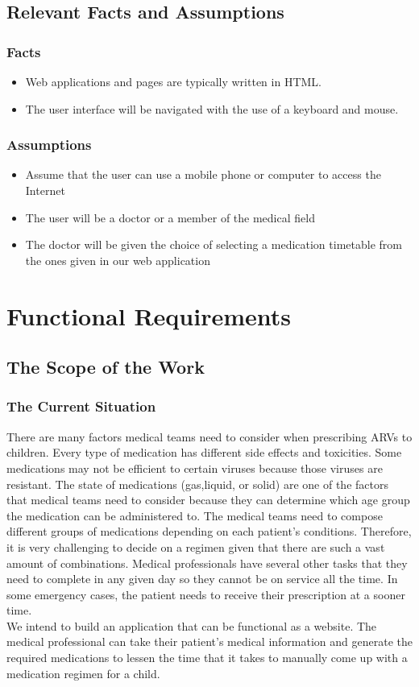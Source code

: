 \documentclass[12pt]{article}
\begin{document}
\subsection{Relevant Facts and Assumptions}
\subsubsection{Facts}
\begin{itemize}
\item Web applications and pages are typically written in HTML.
\item The user interface will be navigated with the use of a keyboard and mouse.
\end{itemize}
\subsubsection{Assumptions}
\begin{itemize}
\item Assume that the user can use a mobile phone or computer to access the Internet
\item The user will be a doctor or a member of the medical field
\item The doctor will be given the choice of selecting a medication timetable from the ones given in our web application
\end{itemize}

\section{Functional Requirements}
\setcounter{subsection}{6}
\subsection{The Scope of the Work}
\subsubsection{The Current Situation}
There are many factors medical teams need to consider when prescribing ARVs to children. Every type of medication has different side effects and toxicities. Some medications may not be efficient to certain viruses because those viruses are resistant. The state of medications (gas,liquid, or solid) are one of the factors that medical teams need to consider because they can determine which age group the medication can be administered to. The medical teams need to compose different groups of medications depending on each patient’s conditions. Therefore, it is very challenging to decide on a regimen given that there are such a vast amount of combinations. Medical professionals have several other tasks that they need to complete in any given day so they cannot be on service all the time. In some emergency cases, the patient needs to receive their prescription at a sooner time. 
\\We intend to build an application that can be functional as a website. The medical professional can take their patient’s medical information and generate the required medications to lessen the time that it takes to manually come up with a medication regimen for a child.
\end{document}
